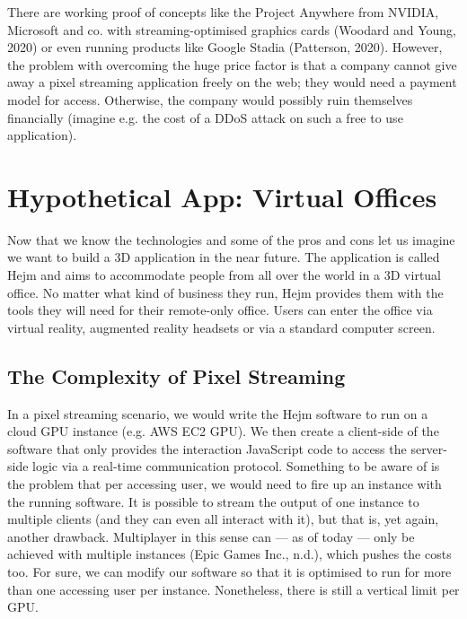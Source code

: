\documentclass[10pt]{article}
\begin{document}
\begin{sloppypar}
  There are working proof of concepts like the Project Anywhere from NVIDIA, Microsoft and co. with streaming-optimised graphics cards (Woodard and Young, 2020) or even running products like Google Stadia (Patterson, 2020). However, the problem with overcoming the huge price factor is that a company cannot give away a pixel streaming application freely on the web; they would need a payment model for access. Otherwise, the company would possibly ruin themselves financially (imagine e.g. the cost of a DDoS attack on such a free to use application).

  \section{Hypothetical App: Virtual Offices}
  \label{sec:hypothetical-app-virtual-offices}

  Now that we know the technologies and some of the pros and cons let us imagine we want to build a 3D application in the near future. The application is called Hejm and aims to accommodate people from all over the world in a 3D virtual office. No matter what kind of business they run, Hejm provides them with the tools they will need for their remote-only office. Users can enter the office via virtual reality, augmented reality headsets or via a standard computer screen.

  \subsection{The Complexity of Pixel Streaming}
  \label{subsec:the-complexity-of-pixel-streaming}

  In a pixel streaming scenario, we would write the Hejm software to run on a cloud GPU instance (e.g. AWS EC2 GPU). We then create a client-side of the software that only provides the interaction JavaScript code to access the server-side logic via a real-time communication protocol. Something to be aware of is the problem that per accessing user, we would need to fire up an instance with the running software. It is possible to stream the output of one instance to multiple clients (and they can even all interact with it), but that is, yet again, another drawback. Multiplayer in this sense can — as of today — only be achieved with multiple instances (Epic Games Inc., n.d.), which pushes the costs too. For sure, we can modify our software so that it is optimised to run for more than one accessing user per instance. Nonetheless, there is still a vertical limit per GPU.


\end{sloppypar}
\end{document}
